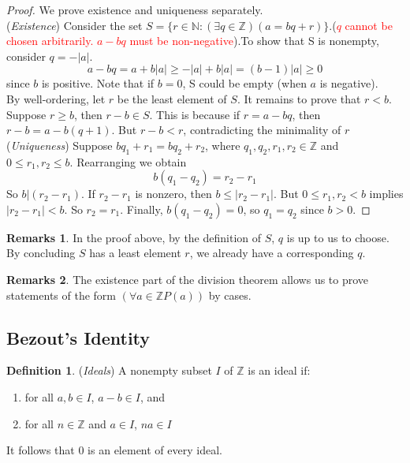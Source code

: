 \documentclass[14pt]{article}
\theoremstyle{definition}
\newtheorem*{remark}{Remarks}
\newtheorem{definition}{Definition}[subsection]
\begin{document}
\begin{proof}
    We prove existence and uniqueness separately.\\
    (\textit{Existence}) Consider the set $S=\{r\in \mathbb{N}\colon (\exists q\in\mathbb{Z})(a=bq+r)\}$.(\textcolor{red}{$q$ cannot be chosen arbitrarily. $a-bq$ must be non-negative}).To show that S is nonempty, consider $q=-|a|$. 
    \begin{equation*}
        a-bq=a+b|a|\geq -|a|+b|a|=(b-1)|a|\geq 0
    \end{equation*}
    since $b$ is positive. Note that if $b=0$, S could be empty (when $a$ is negative). \\
    By well-ordering, let $r$ be the least element of $S$. It remains to prove that $r<b$. Suppose $r\geq b$, then $r-b\in S$. This is because if $r=a-bq$, then $r-b=a-b(q+1)$. But $r-b<r$, contradicting the minimality of $r$\\
    (\textit{Uniqueness}) Suppose $bq_1+r_1=bq_2+r_2$, where $q_1, q_2, r_1, r_2 \in \mathbb{Z}$ and $0\leq r_1, r_2\leq b$. Rearranging we obtain
    \begin{equation*}
        b(q_1-q_2)=r_2-r_1
    \end{equation*}
    So $b|(r_2-r_1)$. If $r_2-r_1$ is nonzero, then $b\leq |r_2-r_1|$. But $0\leq r_1, r_2 < b$ implies $|r_2-r_1|<b$. So $r_2=r_1$. Finally, $b(q_1-q_2)=0$, so $q_1=q_2$ since $b>0$.
\end{proof}
\begin{remark}
    In the proof above, by the definition of $S$, $q$ is up to us to choose. By concluding $S$ has a least  element $r$, we already have a corresponding $q$.
\end{remark}
\begin{remark}
     The existence part of the division theorem allows us to prove statements of the form $(\forall a\in \mathbb{Z}P(a))$ by cases.
\end{remark}

\vspace{5mm} %

\subsection{Bezout's Identity}
\begin{definition}
    (\textit{Ideals})
    A nonempty subset $I$ of $\mathbb{Z}$ is an ideal if:
    \begin{enumerate}
        \item for all $a,b\in I $, $a-b\in I$, and
        \item for all $n\in\mathbb{Z}$ and $a\in I$, $na\in I$
    \end{enumerate}
    It follows that 0 is an element of every ideal.
\end{definition}
\end{document}
